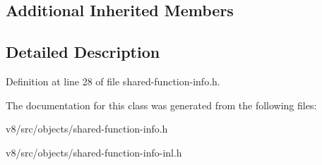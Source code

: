 \subsection*{Additional Inherited Members}


\subsection{Detailed Description}


Definition at line 28 of file shared-\/function-\/info.\+h.



The documentation for this class was generated from the following files\+:\begin{DoxyCompactItemize}
\item 
v8/src/objects/shared-\/function-\/info.\+h\item 
v8/src/objects/shared-\/function-\/info-\/inl.\+h\end{DoxyCompactItemize}
